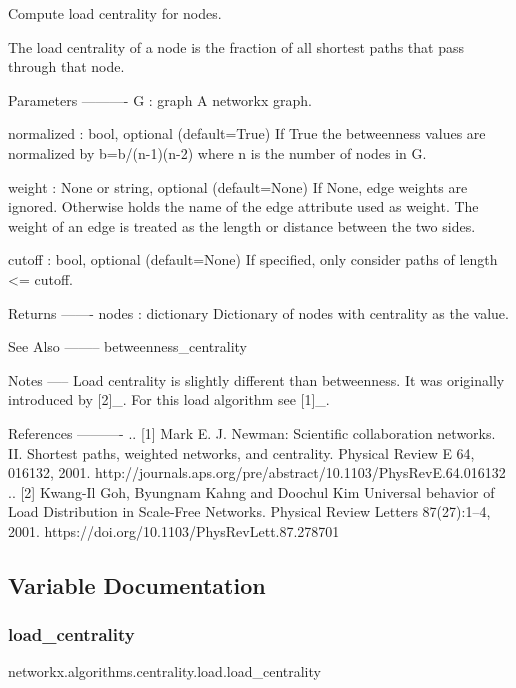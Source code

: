 \begin{DoxyVerb}Compute load centrality for nodes.

The load centrality of a node is the fraction of all shortest
paths that pass through that node.

Parameters
----------
G : graph
  A networkx graph.

normalized : bool, optional (default=True)
  If True the betweenness values are normalized by b=b/(n-1)(n-2) where
  n is the number of nodes in G.

weight : None or string, optional (default=None)
  If None, edge weights are ignored.
  Otherwise holds the name of the edge attribute used as weight.
  The weight of an edge is treated as the length or distance between the two sides.

cutoff : bool, optional (default=None)
  If specified, only consider paths of length <= cutoff.

Returns
-------
nodes : dictionary
   Dictionary of nodes with centrality as the value.

See Also
--------
betweenness_centrality

Notes
-----
Load centrality is slightly different than betweenness. It was originally
introduced by [2]_. For this load algorithm see [1]_.

References
----------
.. [1] Mark E. J. Newman:
   Scientific collaboration networks. II.
   Shortest paths, weighted networks, and centrality.
   Physical Review E 64, 016132, 2001.
   http://journals.aps.org/pre/abstract/10.1103/PhysRevE.64.016132
.. [2] Kwang-Il Goh, Byungnam Kahng and Doochul Kim
   Universal behavior of Load Distribution in Scale-Free Networks.
   Physical Review Letters 87(27):1–4, 2001.
   https://doi.org/10.1103/PhysRevLett.87.278701
\end{DoxyVerb}
 

\subsection{Variable Documentation}
\mbox{\label{namespacenetworkx_1_1algorithms_1_1centrality_1_1load_af4b6efad9f3076cd3eb5dad2beb4d36a}} 
\subsubsection{\texorpdfstring{load\+\_\+centrality}{load\_centrality}}
{\footnotesize\ttfamily networkx.\+algorithms.\+centrality.\+load.\+load\+\_\+centrality}

